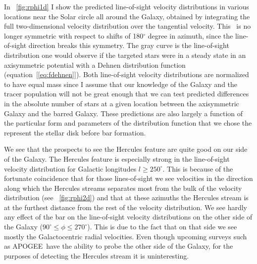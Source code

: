 \documentclass[12pt,preprint]{aastex}
\newcommand{\eqnname}{equation}
\newcommand{\apogee}{APOGEE}
\begin{document}
In \figurename~\ref{fig:rphi1d} I show the predicted line-of-sight
velocity distributions in various locations near the Solar circle all
around the Galaxy, obtained by integrating the full two-dimensional
velocity distribution over the tangential velocity. This
\figurename\ is no longer symmetric with respect to shifts of
180$^{\circ}$ degree in azimuth, since the line-of-sight direction
breaks this symmetry. The gray curve is the line-of-sight distribution
one would observe if the targeted stars were in a steady state in an
axisymmetric potential with a Dehnen distribution function
(\eqnname~[\ref{eq:fdehnen}]). Both line-of-sight velocity
distributions are normalized to have equal mass since I assume that
our knowledge of the Galaxy and the tracer population will not be
great enough that we can test predicted differences in the absolute
number of stars at a given location between the axisymmetric Galaxy
and the barred Galaxy. These predictions are also largely a function
of the particular form and parameters of the distribution function
that we chose the represent the stellar disk before bar formation.

We see that the prospects to see the Hercules feature are quite good
on our side of the Galaxy. The Hercules feature is especially strong
in the line-of-sight velocity distribution for Galactic longitudes $l
\geq 250^{\circ}$. This is because of the fortunate coincidence that
for those lines-of-sight we see velocities in the direction along
which the Hercules streams separates most from the bulk of the
velocity distribution (see \figurename~\ref{fig:rphi2d}) and that at
these azimuths the Hercules stream is at the furthest distance from
the rest of the velocity distribution. We see hardly any effect of the
bar on the line-of-sight velocity distributions on the other side of
the Galaxy ($90^{\circ} \leq \phi \leq 270^{\circ}$). This is due to
the fact that on that side we see mostly the Galactocentric radial
velocities. Even though upcoming surveys such as \apogee\ have the
ability to probe the other side of the Galaxy, for the purposes of
detecting the Hercules stream it is uninteresting.
\end{document}

